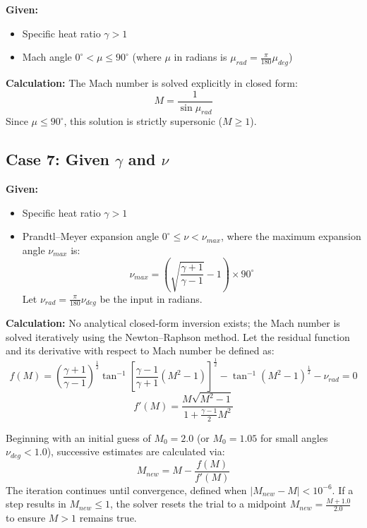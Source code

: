 \textbf{Given:}
\begin{itemize}[nosep]
    \item Specific heat ratio $\gamma > 1$
    \item Mach angle $0^\circ < \mu \le 90^\circ$ (where $\mu$ in radians is $\mu_{rad} = \frac{\pi}{180}\mu_{deg}$)
\end{itemize}

\textbf{Calculation:} The Mach number is solved explicitly in closed form:
\begin{equation}
M = \frac{1}{\sin\mu_{rad}}
\end{equation}
Since $\mu \le 90^\circ$, this solution is strictly supersonic ($M \ge 1$).


\subsection*{Case 7: Given $\gamma$ and $\nu$}

\textbf{Given:}
\begin{itemize}[nosep]
    \item Specific heat ratio $\gamma > 1$
    \item Prandtl--Meyer expansion angle $0^\circ \le \nu < \nu_{max}$, where the maximum expansion angle $\nu_{max}$ is:
    \begin{equation}
    \nu_{max} = \left(\sqrt{\frac{\gamma+1}{\gamma-1}} - 1\right) \times 90^\circ
    \end{equation}
    Let $\nu_{rad} = \frac{\pi}{180}\nu_{deg}$ be the input in radians.
\end{itemize}

\textbf{Calculation:} No analytical closed-form inversion exists; the Mach number is solved iteratively using the Newton--Raphson method. Let the residual function and its derivative with respect to Mach number be defined as:
\begin{equation}
f(M) = \left(\frac{\gamma+1}{\gamma-1}\right)^{\frac{1}{2}}\tan^{-1}\left[\frac{\gamma-1}{\gamma+1}(M^2-1)\right]^{\frac{1}{2}} - \tan^{-1}(M^2-1)^{\frac{1}{2}} - \nu_{rad} = 0
\end{equation}
\begin{equation}
f'(M) = \frac{M\sqrt{M^2-1}}{1+\frac{\gamma-1}{2}M^2}
\end{equation}

Beginning with an initial guess of $M_0 = 2.0$ (or $M_0 = 1.05$ for small angles $\nu_{deg} < 1.0$), successive estimates are calculated via:
\begin{equation}
M_{new} = M - \frac{f(M)}{f'(M)}
\end{equation}
The iteration continues until convergence, defined when $|M_{new} - M| < 10^{-6}$. If a step results in $M_{new} \le 1$, the solver resets the trial to a midpoint $M_{new} = \frac{M + 1.0}{2.0}$ to ensure $M > 1$ remains true.




